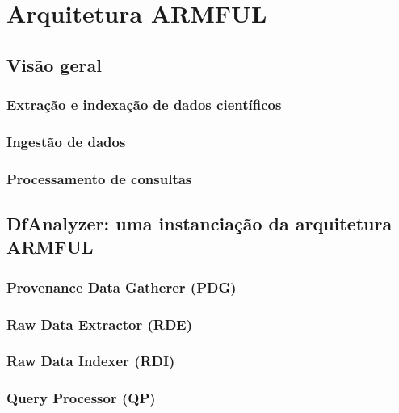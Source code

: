 
\chapter{Arquitetura ARMFUL}%
\label{chap:arquitetura-armful}


\section{Visão geral}


\subsection{Extração e indexação de dados científicos}


\subsection{Ingestão de dados}


\subsection{Processamento de consultas}



\section{DfAnalyzer: uma instanciação da arquitetura ARMFUL}

\subsection{Provenance Data Gatherer (PDG)}

\subsection{Raw Data Extractor (RDE)}

\subsection{Raw Data Indexer (RDI)}

\subsection{Query Processor (QP)}